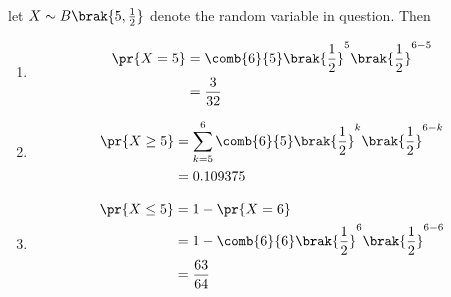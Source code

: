 let $X \sim B\brak{5,\frac{1}{2}}$ denote the random variable in question.  Then
\begin{enumerate}
\item 
\begin{align}
\pr{X=5} &= \comb{6}{5}\brak{\frac{1}{2}}^5\brak{\frac{1}{2}}^{6-5}
\\
&=\frac{3}{32}
\end{align}
\item 
\begin{align}
\pr{X \ge 5} &= \sum_{k=5}^{6}\comb{6}{5}\brak{\frac{1}{2}}^k\brak{\frac{1}{2}}^{6-k}
\\
&= 0.109375
\end{align}
\item 
\begin{align}
\pr{X \le 5} &= 1 - \pr{X = 6}
\\
&=1-\comb{6}{6}\brak{\frac{1}{2}}^6\brak{\frac{1}{2}}^{6-6}
\\
&= \frac{63}{64}
\end{align}

\end{enumerate}

